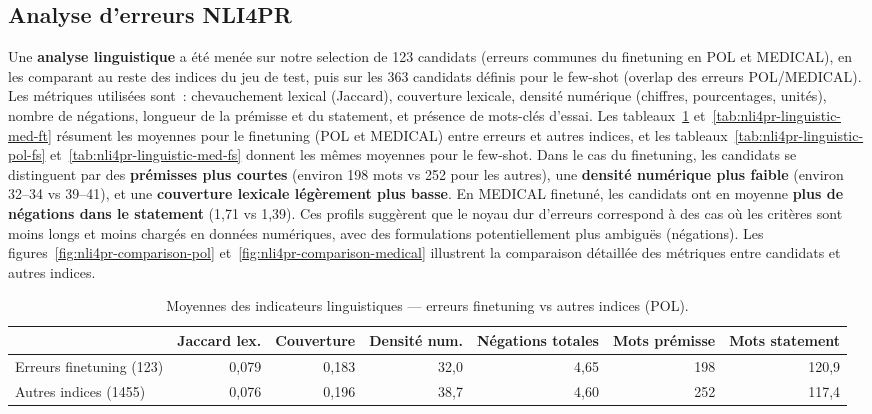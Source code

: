 \documentclass[10pt,twoside]{article}
\begin{document}
\subsection{Analyse d'erreurs NLI4PR}

Une \textbf{analyse linguistique} a été menée sur notre selection de 123 candidats (erreurs communes du finetuning en POL et MEDICAL), en les comparant au reste des indices du jeu de test, puis sur les 363 candidats définis pour le few-shot (overlap des erreurs POL/MEDICAL). Les métriques utilisées sont~: chevauchement lexical (Jaccard), couverture lexicale, densité numérique (chiffres, pourcentages, unités), nombre de négations, longueur de la prémisse et du statement, et présence de mots-clés d'essai. Les tableaux~\ref{tab:nli4pr-linguistic-pol-ft} et~\ref{tab:nli4pr-linguistic-med-ft} résument les moyennes pour le finetuning (POL et MEDICAL) entre erreurs et autres indices, et les tableaux~\ref{tab:nli4pr-linguistic-pol-fs} et~\ref{tab:nli4pr-linguistic-med-fs} donnent les mêmes moyennes pour le few-shot. Dans le cas du finetuning, les candidats se distinguent par des \textbf{prémisses plus courtes} (environ 198 mots vs 252 pour les autres), une \textbf{densité numérique plus faible} (environ 32--34 vs 39--41), et une \textbf{couverture lexicale légèrement plus basse}. En MEDICAL finetuné, les candidats ont en moyenne \textbf{plus de négations dans le statement} (1,71 vs 1,39). Ces profils suggèrent que le noyau dur d'erreurs correspond à des cas où les critères sont moins longs et moins chargés en données numériques, avec des formulations potentiellement plus ambiguës (négations). Les figures~\ref{fig:nli4pr-comparison-pol} et~\ref{fig:nli4pr-comparison-medical} illustrent la comparaison détaillée des métriques entre candidats et autres indices.

\begin{table}[H]
\centering
\caption{Moyennes des indicateurs linguistiques — erreurs finetuning vs autres indices (POL).}
\label{tab:nli4pr-linguistic-pol-ft}
\scriptsize
\begin{tabular}{lrrrrrr}
\toprule
 & Jaccard lex. & Couverture & Densité num. & Négations totales & Mots prémisse & Mots statement \\
\midrule
Erreurs finetuning (123) & 0,079 & 0,183 & 32,0 & 4,65 & 198 & 120,9 \\
Autres indices (1455)    & 0,076 & 0,196 & 38,7 & 4,60 & 252 & 117,4 \\
\bottomrule
\end{tabular}
\end{table}
\end{document}
